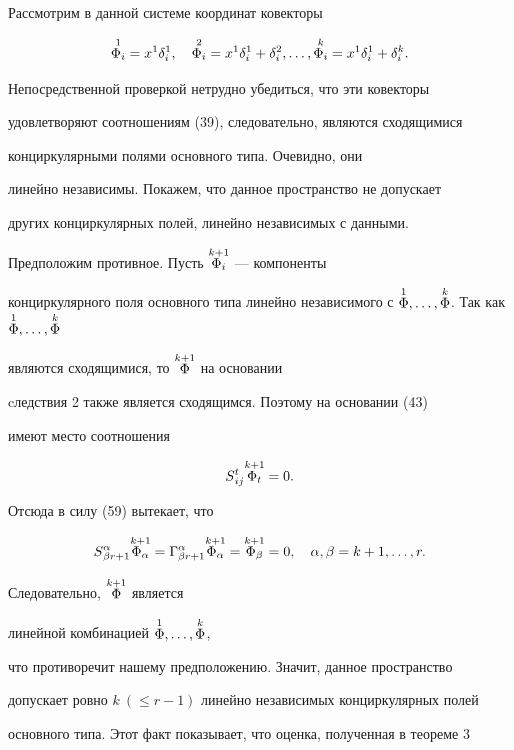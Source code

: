 Рассмотрим в данной системе координат ковекторы


$$


\os {{\F }_i}1=x^1 { \de}_{i}^{1},\quad \os {{\F }_i}2=


x^1 { \de}_{i}^{1}+{ \de}_{i}^{2},\ds,\os {{\F }_i}k=


x^1 { \de}_{i}^{1}+{ \de}_{i}^{k}.


$$


Непосредственной проверкой нетрудно убедиться, что эти ковекторы


удовлетворяют соотношениям (39), следовательно, являются сходящимися


конциркулярными полями основного типа. Очевидно, они


линейно независимы. Покажем, что данное пространство не допускает


других конциркулярных полей, линейно независимых с данными.


Предположим противное. Пусть $\os {{\F }_i}{k+1}$ --- компоненты


конциркулярного поля основного типа линейно независимого с $\os


{\F}1,\ds,\os {\F }k$. Так как $\os {\F}1,\ds,\os {\F }k$


являются сходящимися, то $\os {{\F }}{k+1}$ на основании


cледствия 2 также является сходящимся. Поэтому на основании (43)


имеют место соотношения


$$


S{}_{ij}^t \os {{\F }_t}{k+1}=0.


$$


Отсюда в силу (59) вытекает, что


$$


S{}_{\be r+1}^{\a} \os {{\F_{\a}}}{k+1}=\Ga{}_{\be


r+1}^{\a} \os {{\F_{\a}}}{k+1}=\os {{\F_{\be}}}{k+1}=0,\quad


{\a}, {\be}=k+1,\ds, r.


$$


Следовательно, $\os {{\F }}{k+1}$ является


линейной комбинацией $\os {\F}1,\ds, \os {\F }k$,


что противоречит нашему предположению. Значит, данное пространство


допускает ровно $k\ (\le r-1)$ линейно независимых конциркулярных полей


основного типа. Этот факт показывает, что оценка, полученная в теореме 3


